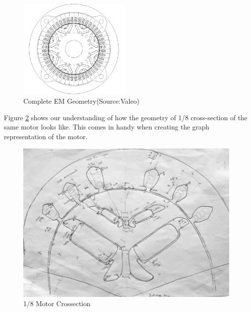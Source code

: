\documentclass{report} %
\begin{document}
\begin{figure}[H]
    \centering
    \includegraphics[width=0.5\textwidth]{./ReportImages/FullMotorv2.png} 
    \caption{Complete EM Geometry(Source:Valeo)}
    \label{fig:Full Motor}
\end{figure}

Figure \ref{fig:1/8 Motor Crossection} shows our understanding of how the geometry of 1/8 cross-section of the same motor looks like.
This comes in handy when creating the graph representation of the motor.\\

\begin{figure}[H]
    \centering
    \includegraphics[width=1\textwidth]{./ReportImages/EMCrosssectionFiltered.png} 
    \caption{1/8 Motor Crossection}
    \label{fig:1/8 Motor Crossection}
\end{figure}
\end{document}
